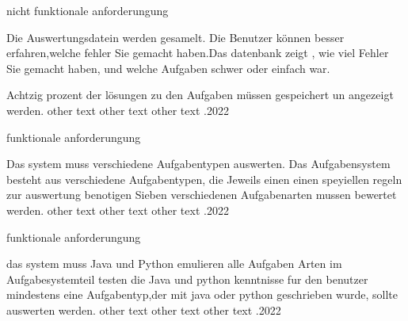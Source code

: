 
\begin{myreq}
  
    \reqtype nicht  funktionale anforderungung
 
  \reqdesc Die Auswertungsdatein werden gesamelt.
  \reqrat Die Benutzer können besser erfahren,welche fehler
Sie gemacht haben.Das datenbank zeigt , wie viel Fehler
Sie gemacht haben, und welche Aufgaben schwer oder einfach
war.
   
  \reqorig 
  \reqfit Achtzig prozent der lösungen zu den Aufgaben müssen gespeichert un angezeigt werden.
  \twoinline
  \reqdep 
  \reqconf
  \reqmater other text other text other text 
  .2022
\end{myreq}


\begin{myreq}
  
    \reqtype funktionale anforderungung
 
  \reqdesc Das system muss verschiedene Aufgabentypen auswerten.
  \reqrat Das Aufgabensystem besteht aus verschiedene Aufgabentypen,
die Jeweils einen einen speyiellen regeln zur
auswertung benotigen
  \reqorig 
  \reqfit Sieben verschiedenen Aufgabenarten mussen bewertet werden.
  \twoinline
  \reqdep 
  \reqconf
  \reqmater other text other text other text 
  .2022
\end{myreq}

\begin{myreq}
  
    \reqtype funktionale anforderungung
 
  \reqdesc das system muss Java und Python emulieren
  \reqrat alle Aufgaben Arten im Aufgabesystemteil testen die
Java und python kenntnisse fur den benutzer
  \reqorig 
  \reqfit mindestens eine Aufgabentyp,der mit java oder python geschrieben wurde, sollte auswerten werden.
  \twoinline
  \reqdep 
  \reqconf
  \reqmater other text other text other text 
  .2022
\end{myreq}
